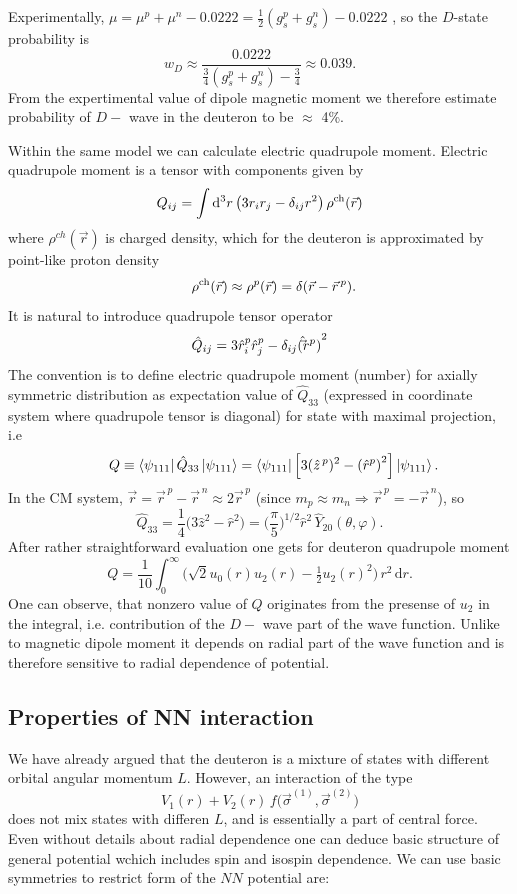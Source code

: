 \documentclass[11pt,a4paper]{article}
\newcommand{\op}[1]{\hat{#1}}
\newcommand{\ud}{\mathrm{d}}
\begin{document}
Experimentally, $\mu=\mu^p+\mu^n-0.0222=\tfrac12(g_s^p+g_s^n)-0.0222$ , so the
$D$-state probability is
\[
w_D \approx
\frac{0.0222}{\tfrac34(g_s^p+g_s^n)-\tfrac34} \approx  0.039.
\]
From the expertimental value of dipole magnetic moment we therefore estimate probability of $D-$ wave in the deuteron to be $\approx$ 4\%.

Within the same model we can calculate electric quadrupole moment. Electric quadrupole moment is a tensor with components given by
\[
Q_{ij}=\int \ud^3r\,\big(3r_ir_j-\delta_{ij}r^2\big)\,\rho^{\rm ch}(\vec r)
\]
where $\rho^{ch}(\vec r)$ is charged density, which for the deuteron is approximated by  point-like proton density
\[
\qquad
\rho^{\rm ch}(\vec r)\approx\rho^p(\vec r)=\delta(\vec r-\vec r^{\,p}).
\]
It is natural to introduce quadrupole tensor operator
\[
\op Q_{ij}=3\op r^{p}_i\op r^{p}_j - \delta_{ij}{(\op \vec{r^p})}^2
\]
The convention is to define electric quadrupole moment (number) for axially symmetric distribution as
expectation value of $\op Q_{33}$ (expressed  in coordinate system where quadrupole tensor is diagonal) for state with maximal projection, i.e 
\[
\qquad
Q \equiv \bra {\psi_{111}} \op Q_{33} \ket {\psi_{111}}=\bra {\psi_{111}} \Big[3(\hat z^{\,p})^2-{(\op r^{p})}^2\Big] \ket {\psi_{111}}.
\]
In the CM system, $\vec r=\vec r^{\,p}-\vec r^{\,n}\approx 2\vec r^{\,p}$ (since
$m_p\approx m_n\Rightarrow \vec r^{\,p}=-\vec r^{\,n}$), so
\[
\op Q_{33}=\frac{1}{4}\big(3\op z^2-\op r^2\big)=\Big(\frac{\pi}{5}\Big)^{1/2}\op r^2\,\op Y_{20}(\theta,\varphi).
\]
After rather straightforward evaluation one gets for deuteron quadrupole moment
\[
Q =\frac{1}{10}\int_0^\infty\Big(\sqrt{2} u_0 (r) u_2 (r) -\tfrac12 u_2(r)^2\Big)\,r^2\,\ud r .
\]
One can observe, that nonzero value of $Q$ originates from the presense of $u_2$ in the integral, i.e. contribution of the $D-$ wave part of the wave function. Unlike to magnetic dipole moment it depends on radial part of the wave function and is therefore sensitive to radial dependence of potential. 

\subsection {Properties of NN interaction}
We have already argued that the deuteron is a mixture of states with different orbital angular momentum $L$. However, an interaction of the type
\[
V_1(r)+V_2(r)\,f\big(\vec\sigma^{(1)},\vec\sigma^{(2)}\big)
\]
does not mix states with differen $L$, and is essentially a part of central force. Even without details about radial dependence one can deduce basic structure of general potential wchich includes spin and isospin dependence.  
We can use basic symmetries to restrict form of the $NN$ potential are:
\end{document}
